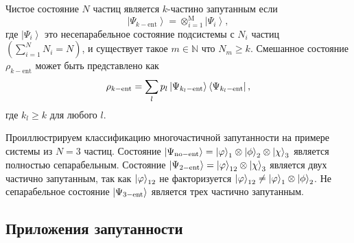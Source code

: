 \begin{definition}\label{def:manyparticle-entanglement}
  Чистое состояние $N$ частиц является $k$-частино запутанным если
  $$
  \left| \Psi_{k-\mathrm{ent}} \right\rangle
  	= \otimes^\mathrm{M}_{i=1} \left| \Psi_{i} \right\rangle,
  $$
  где $\left| \Psi_{i} \right\rangle$ это несепарабельное состояние подсистемы с $N_i$ частиц
  $\left( \sum_{i=1}^N N_i = N \right)$,
  и существует такое  $ m \in \mathbb{N}$ что $N_{m} \ge k$.
  Смешанное состояние $\rho_{k-\mathrm{ent}}$ может быть представлено как
  $$
  \rho_{k-\mathrm{ent}} =
  \sum\limits_{l} p_l \left| \Psi_{k_l-\mathrm{ent}} \right\rangle\left\langle \Psi_{k_l-\mathrm{ent}} \right|,
  $$
  где $k_l \geq k$ для любого $l$.
\end{definition}


Проиллюстрируем классификацию многочастичной запутанности на примере системы из $N = 3$ частиц.
Состояние
$\left| \Psi_\mathrm{no-ent} \right\rangle = \left| \varphi \right\rangle_1 \otimes \left| \phi \right\rangle_2 \otimes \left| \chi \right\rangle_3$
является полностью сепарабельным.
Состояние
$\left| \Psi_{2-\mathrm{ent}} \right\rangle = \left| \varphi \right\rangle_{12} \otimes \left| \chi \right\rangle_3$
является двух частично запутанным,
так как $\left| \varphi \right\rangle_{12}$ не факторизуется
$\left| \varphi \right\rangle_{12} \neq \left| \varphi \right\rangle_1 \otimes \left| \phi \right\rangle_2$.
Не сепарабельное состояние $\left| \Psi_{3-\mathrm{ent}} \right\rangle$ является трех частично запутанным.




\subsection{Приложения запутанности}


%
%
%


